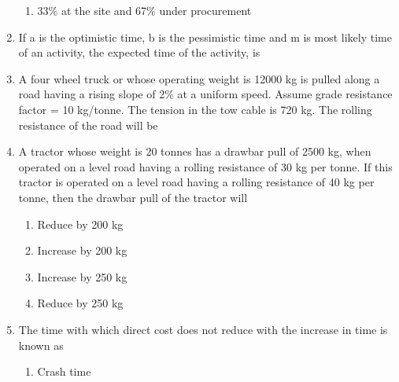 \documentclass[11pt,a4paper]{article}
\begin{document}
\begin{enumerate}
\begin{enumerate}[label=\Alph*.]
\item{33\% at the site and 67\% under procurement}
\end{enumerate}
\item{If a is the optimistic time, b is the pessimistic time and m is most likely time of an activity, the expected time of the activity, is}
\\
\item{A four wheel truck or whose operating weight is 12000 kg is pulled along a road having a rising slope of 2\% at a uniform speed. Assume grade resistance factor = 10 kg/tonne. The tension in the tow cable is 720 kg. The rolling resistance of the road will be}
\\
\item{A tractor whose weight is 20 tonnes has a drawbar pull of 2500 kg, when operated on a level road having a rolling resistance of 30 kg per tonne. If this tractor is operated on a level road having a rolling resistance of 40 kg per tonne, then the drawbar pull of the tractor will}
\begin{enumerate}[label=\Alph*.]
\item{Reduce by 200 kg}
\item{Increase by 200 kg}
\item{Increase by 250 kg}
\item{Reduce by 250 kg}
\end{enumerate}
\item{The time with which direct cost does not reduce with the increase in time is known as}
\begin{enumerate}[label=\Alph*.]
\item{Crash time}

\end{enumerate}
\end{enumerate}
\end{document}
